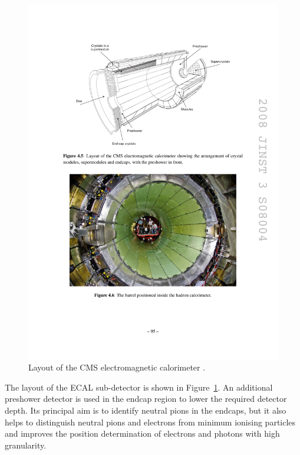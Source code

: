 \begin{figure}[!htbp]
  \begin{center}
    \leavevmode
    \includegraphics[width=\columnwidth]{ECAL}
    \caption{Layout of the CMS electromagnetic calorimeter \cite{CMS}.}
    \label{ECAL}
  \end{center}
\end{figure}

The layout of the ECAL sub-detector is shown in Figure~\ref{ECAL}. An additional preshower detector is used in the
endcap region to lower the required detector depth. Its principal aim is to identify neutral pions in the endcaps, but
it also helps to distinguish neutral pions and electrons from minimum ionising particles and improves the position
determination of electrons and photons with high granularity.

